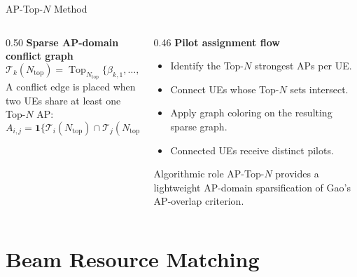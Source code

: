 \documentclass[10pt,aspectratio=169]{beamer}
\newcommand{\TopN}{AP-Top-$N$}
\newenvironment{tightitemize}{%
    \begin{itemize}
        \setlength{\itemsep}{2pt}
        \setlength{\parskip}{0pt}
        \setlength{\parsep}{0pt}
}{%
    \end{itemize}
}
\begin{document}
\begin{frame}{AP-Top-\(N\) Method}
    \small
    \begin{columns}[T,onlytextwidth]
        \begin{column}{0.50\textwidth}
            \textbf{Sparse AP-domain conflict graph}
            \[
                \mathcal{T}_k(N_{\mathrm{top}})
                =
                \operatorname{Top}_{N_{\mathrm{top}}}
                \{\beta_{k,1},\ldots,\beta_{k,L}\}.
            \]
            A conflict edge is placed when two UEs share at least one Top-\(N\) AP:
            \[
                A_{i,j}
                =
                \mathbf{1}\{
                \mathcal{T}_i(N_{\mathrm{top}})
                \cap
                \mathcal{T}_j(N_{\mathrm{top}})
                \neq \varnothing
                \}.
            \]
        \end{column}
        \begin{column}{0.46\textwidth}
            \textbf{Pilot assignment flow}
            \begin{tightitemize}
                \item Identify the Top-\(N\) strongest APs per UE.
                \item Connect UEs whose Top-\(N\) sets intersect.
                \item Apply graph coloring on the resulting sparse graph.
                \item Connected UEs receive distinct pilots.
            \end{tightitemize}
            
            \vspace{0.6em}
            \begin{block}{Algorithmic role}
                \TopN{} provides a lightweight AP-domain sparsification of Gao's AP-overlap criterion.
            \end{block}
        \end{column}
    \end{columns}
\end{frame}

\section{Beam Resource Matching}
\end{document}
